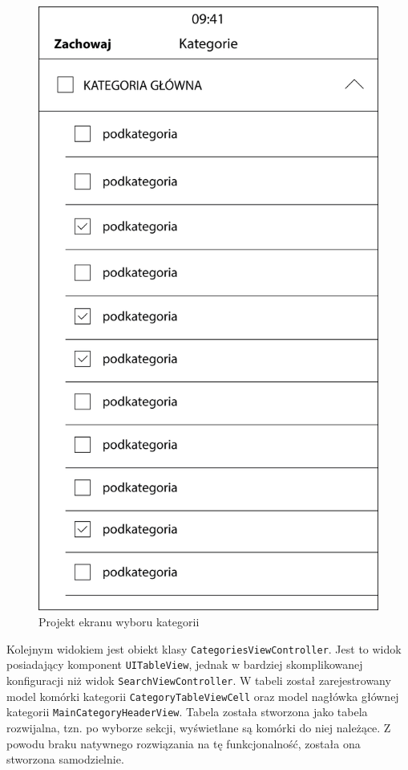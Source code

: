 \documentclass[twoside]{projektInzynierskiMS}
\begin{document}
\begin{figure}[h]
  \centering
  \includegraphics[width=0.4\linewidth]{img/CategoriesProject.png}
  \caption{Projekt ekranu wyboru kategorii}
  \label{fig:iosCategories}
\end{figure}

Kolejnym widokiem jest obiekt klasy \verb`CategoriesViewController`. Jest to widok posiadający komponent \verb`UITableView`, jednak w bardziej skomplikowanej konfiguracji niż widok \verb`SearchViewController`. W tabeli został zarejestrowany model komórki kategorii \verb`CategoryTableViewCell` oraz model nagłówka głównej kategorii \verb`MainCategoryHeaderView`. Tabela została stworzona jako tabela rozwijalna, tzn. po wyborze sekcji, wyświetlane są komórki do niej należące. Z powodu braku natywnego rozwiązania na tę funkcjonalność, została ona stworzona samodzielnie.
\end{document}
